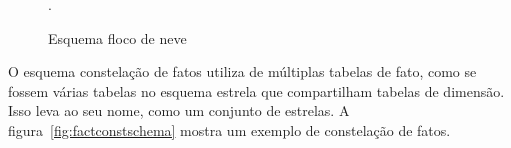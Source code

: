 \begin{figure}[!htb]
	\caption{Esquema floco de neve}\label{fig:snowflakeschema}
	\vspace{2mm}
	\begin{center}
	\end{center}
	\vspace{1mm}
	\legenda{}
	.
\end{figure}

O esquema constelação de fatos utiliza de múltiplas tabelas de fato, como se fossem várias tabelas no esquema estrela que compartilham tabelas de dimensão.
Isso leva ao seu nome, como um conjunto de estrelas.
A figura~\ref{fig:factconstschema} mostra um exemplo de constelação de fatos.

